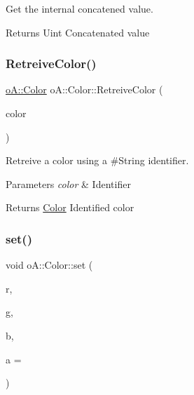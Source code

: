 Get the internal concatened value. 

\begin{DoxyReturn}{Returns}
Uint Concatenated value 
\end{DoxyReturn}
\mbox{\label{classo_a_1_1_color_ae637744de31ea0e978b58a836db49884}} 
\subsubsection{\texorpdfstring{Retreive\+Color()}{RetreiveColor()}}
{\footnotesize\ttfamily \mbox{\hyperlink{classo_a_1_1_color}{o\+A\+::\+Color}} o\+A\+::\+Color\+::\+Retreive\+Color (\begin{DoxyParamCaption}\item[{const \mbox{\hyperlink{classo_a_1_1_string}{String}} \&}]{color }\end{DoxyParamCaption})\hspace{0.3cm}{\ttfamily [static]}}



Retreive a color using a \#\+String identifier. 


\begin{DoxyParams}{Parameters}
{\em color} & Identifier \\
\hline
\end{DoxyParams}
\begin{DoxyReturn}{Returns}
\mbox{\hyperlink{classo_a_1_1_color}{Color}} Identified color 
\end{DoxyReturn}
\mbox{\label{classo_a_1_1_color_aaf0ba215d5bd4946f93a68bab2a8d66d}} 
\subsubsection{\texorpdfstring{set()}{set()}}
{\footnotesize\ttfamily void o\+A\+::\+Color\+::set (\begin{DoxyParamCaption}\item[{\mbox{\hyperlink{namespaceo_a_a8c38e43a304d568b8495770dd8d50513}{U\+Byte}}}]{r,  }\item[{\mbox{\hyperlink{namespaceo_a_a8c38e43a304d568b8495770dd8d50513}{U\+Byte}}}]{g,  }\item[{\mbox{\hyperlink{namespaceo_a_a8c38e43a304d568b8495770dd8d50513}{U\+Byte}}}]{b,  }\item[{\mbox{\hyperlink{namespaceo_a_a8c38e43a304d568b8495770dd8d50513}{U\+Byte}}}]{a = {} }\end{DoxyParamCaption})}



